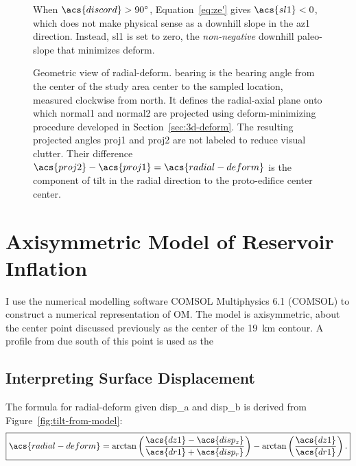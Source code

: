 \begin{figure}
    {\caption[Reversal case: $\acs{discord}>\ang{90}$]{When $\acs{discord}>\ang{90}$, Equation~\eqref{eq:ze'} gives $\acs{sl1}<0$, which does not make physical sense as a downhill slope in the \acs{az1} direction. Instead, \acs{sl1} is set to zero, the \emph{non-negative} downhill paleo-slope that minimizes \acs{deform}.}\label{fig:reversal}}
    {\hspace*{-0.4\linewidth}}
    \vspace*{-9em}
    {\caption[Calculation of \acf{radial-deform} from mapping]{Geometric view of \acl{radial-deform}. \acs{bearing} is the bearing angle from the center of the study area \acs{center} to the sampled location, measured clockwise from \acf{north}. It defines the radial-axial plane onto which \acs{normal1} and \acs{normal2} are projected using \acs{deform}-minimizing procedure developed in Section~\ref{sec:3d-deform}. The resulting projected angles \acs{proj1} and \acs{proj2} are not labeled to reduce visual clutter. Their difference $\acs{proj2}-\acs{proj1}=\acs{radial-deform}$ is the component of tilt in the radial direction to the proto-edifice center \acs{center}.}\label{fig:radial}}
    {}
\end{figure}

\section{Axisymmetric Model of Reservoir Inflation}

I use the numerical modelling software COMSOL Multiphysics 6.1 (COMSOL) to construct a numerical representation of \acf{OM}. The model is axisymmetric, about the center point discussed previously as the center of the \qty{19}{\km} contour. A profile from due south of this point is used as the 

\subsection{Interpreting Surface Displacement}

The formula for \acf{radial-deform} given \acs{disp_a} and \acs{disp_b} is derived from Figure~\ref{fig:tilt-from-model}:
\begin{equation}
    \boxed{\acs{radial-deform} = 
    \arctan\left(\dfrac{\acs{dz1}-\acs{disp_z}}{\acs{dr1}+\acs{disp_r}}\right) - \arctan\left(\frac{\acs{dz1}}{\acs{dr1}}\right).}\label{eq:tilt-from-model}
\end{equation}

